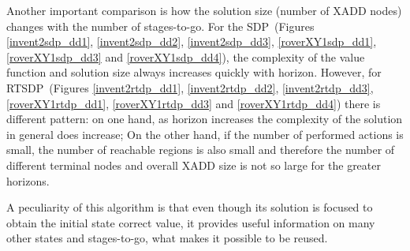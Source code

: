 Another important comparison is how the solution size (number of XADD nodes) changes with the  number of stages-to-go. For the SDP~(Figures \ref{invent2sdp_dd1}, \ref{invent2sdp_dd2}, \ref{invent2sdp_dd3}, \ref{roverXY1sdp_dd1}, \ref{roverXY1sdp_dd3} and \ref{roverXY1sdp_dd4}), the complexity of the value function and solution size always increases quickly with horizon.
However, for RTSDP~(Figures \ref{invent2rtdp_dd1}, \ref{invent2rtdp_dd2}, \ref{invent2rtdp_dd3}, \ref{roverXY1rtdp_dd1}, \ref{roverXY1rtdp_dd3} and \ref{roverXY1rtdp_dd4}) there is different pattern: on one hand, as horizon increases the complexity of the solution in general does increase; On the other hand, if the number of performed actions is small, the number of reachable regions is also small and therefore the number of different terminal nodes and overall XADD size is not so large for the greater horizons. 

A peculiarity of this algorithm is that even though its solution is focused to obtain the initial state correct value, it provides useful information on many other states and stages-to-go, what makes it possible to be reused.


